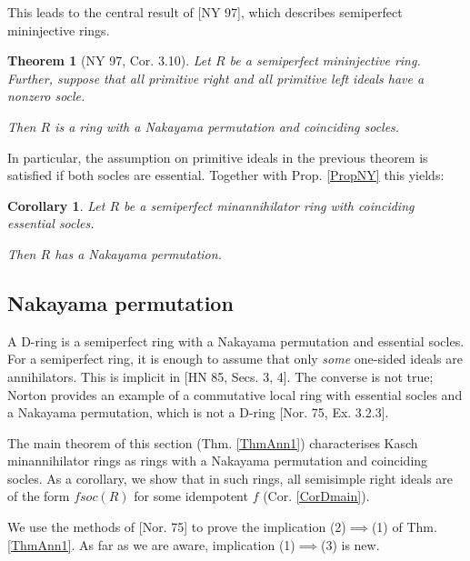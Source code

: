 \documentclass[11pt]{article}
\theoremstyle{plain}
\newtheorem{Thm}[veta]{Theorem}
\newtheorem{Cor}[veta]{Corollary}
\theoremstyle{remark}
\theoremstyle{plain}
\begin{document}
This leads to the central result of [NY 97], which describes semiperfect mininjective rings.
\begin{Thm}[NY 97, Cor. 3.10]\label{ThmNY}
Let $R$ be a semiperfect mininjective ring. Further, suppose that all primitive right and all primitive left ideals have a nonzero socle.

Then $R$ is a ring with a Nakayama permutation and coinciding socles.    
\end{Thm}


In particular, the assumption on primitive ideals in the previous theorem is satisfied if both socles are essential. Together with Prop. \ref{PropNY} this yields:
\begin{Cor}
    Let $R$ be a semiperfect minannihilator ring with coinciding essential socles. 

    Then $R$ has a Nakayama permutation.
\end{Cor}






\subsection{Nakayama permutation}\label{SecDNak}

A D-ring is a semiperfect ring with a Nakayama permutation and essential socles. For a semiperfect ring, it is enough to assume that only \textit{some} one-sided ideals are annihilators. This is implicit in [HN 85, Secs. 3, 4]. The converse is not true; Norton provides an example of a commutative local ring with essential socles and a Nakayama permutation, which is not a D-ring [Nor. 75, Ex. 3.2.3].



The main theorem of this section (Thm. \ref{ThmAnn1}) characterises Kasch minannihilator rings as rings with a Nakayama permutation and coinciding socles. As a corollary, we show that in such rings, all semisimple right ideals are of the form $fsoc(R)$ for some idempotent $f$ (Cor. \ref{CorDmain}).

We use the methods of [Nor. 75] to prove the implication (2)$\implies$(1) of Thm. \ref{ThmAnn1}.  As far as we are aware, implication (1)$\implies$(3) is new.

\smallskip 
\end{document}
